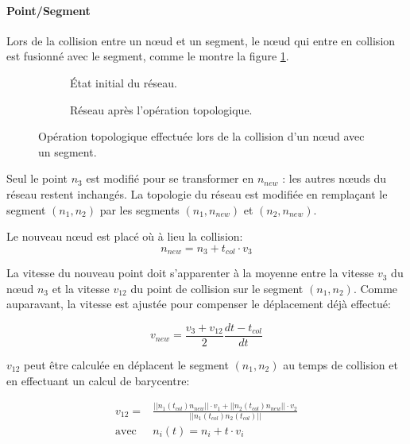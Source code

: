 \documentclass[11pt,class=article,float=false,crop=false]{standalone}
\begin{document}
\paragraph{Point/Segment}

Lors de la collision entre un nœud et un segment, le nœud qui entre en collision est fusionné avec le segment, comme le montre la figure \ref{fig:topo_nomove_pointseg}.

\begin{figure}[h]
	\centering
	\begin{subfigure}[b]{0.5\textwidth}
		\centering
		\caption{État initial du réseau.}
	\end{subfigure}%
	\begin{subfigure}[b]{0.5\textwidth}
		\centering
		\caption{Réseau après l'opération topologique.}
	\end{subfigure}
	\caption{Opération topologique effectuée lors de la collision d'un nœud avec un segment.}
	\label{fig:topo_nomove_pointseg}
\end{figure}

Seul le point $n_3$ est modifié pour se transformer en $n_{new}$ : les autres nœuds du réseau restent inchangés. La topologie du réseau est modifiée en remplaçant le segment $(n_1,n_2)$ par les segments $(n_1,n_{new})$ et $(n_2,n_{new})$.

Le nouveau nœud est placé où à lieu la collision:
\begin{equation}
n_{new} = n_3 + t_{col} \cdot v_3
\end{equation}

La vitesse du nouveau point doit s'apparenter à la moyenne entre la vitesse $v_3$ du nœud $n_3$ et la vitesse $v_{12}$ du point de collision sur le segment $(n_1,n_2)$. Comme auparavant, la vitesse est ajustée pour compenser le déplacement déjà effectué:

\begin{equation}
v_{new} = \frac{v_3+v_{12}}2 \frac{dt-t_{col}}{dt}
\end{equation}

$v_{12}$ peut être calculée en déplacent le segment $(n_1,n_2)$ au temps de collision et en effectuant un calcul de barycentre:

\begin{equation}
\begin{split}
v_{12} = & \frac{||n_1(t_{col})n_{new}|| \cdot v_1 + ||n_2(t_{col})n_{new}|| \cdot v_2}
{||n_1(t_{col})n_2(t_{col})||} \\                
\text{avec } & n_i(t) = n_i + t \cdot v_i
\end{split}
\end{equation}
\end{document}
